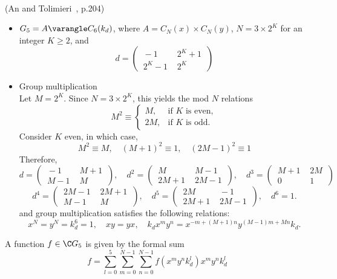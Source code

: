 \begin{example}[Semidirect Product, $G_5 = A \varangle C_6(k_d)$]\\
(An and Tolimieri~\cite{An:2003}, p.204)
\begin{itemize}
\item $G_5 = A \varangle C_6(k_d)$, where $A = C_N(x) \times C_N(y)$,
$N = 3 \times 2^K$ for an integer $K\geq 2$, and 
\[
d =
\begin{pmatrix}
\,-1 \,& \,2^K+1\, \\
\,2^K-1 \,& \,2^K\,
\end{pmatrix}
\]
\item Group multiplication\\
Let $M = 2^K$.  Since $N=3 \times 2^K$, this yields the mod
$N$ relations
\[
M^2 \equiv 
  \begin{cases}
    M, & \text{if $K$ is even}, \\
    2M,& \text{if $K$ is odd}.
  \end{cases} 
\]
Consider $K$ even, in which case,
\[
M^2 \equiv M, \quad (M+1)^2 \equiv 1, \quad (2M-1)^2 \equiv 1
\]
Therefore, 
\[
d = \begin{pmatrix}
     \,-1 \,& \,M+1\, \\
     \,M-1 \,& \,M\,
    \end{pmatrix},\quad
d^2 =\begin{pmatrix}
     \,M \,& \,M-1\, \\
     \,2M+1 \,& \,2M-1\,
    \end{pmatrix},\quad
d^3 =\begin{pmatrix}
     \,M+1 \,& \,2M\, \\
     \,0 \,& \,1\,
    \end{pmatrix}
\]
\[
d^4 =\begin{pmatrix}
     \,2M-1 \,& \,2M+1\, \\
     \,M-1 \,& \,M\,
    \end{pmatrix}, \quad
d^5 =\begin{pmatrix}
     \,2M \,& \,-1\, \\
     \,2M+1 \,& \,2M-1\,
    \end{pmatrix}, \quad
d^6 = 1.
\]
and group multiplication satisfies the following relations:
\[
x^N = y^N = k_d^6 = 1,\quad xy = yx,\quad k_d x^m y^n = x^{-m+(M+1)n} y^{(M-1)m+Mn}k_d.
\]
\end{itemize}
A function $f\in \C G_5$ is given by the formal sum
\[ 
 f = \sum_{l=0}^5 \sum_{m=0}^{N-1} \sum_{n=0}^{N-1}
      f(x^m y^n k_d^l)x^m y^n k_d^l
\]
\end{example}

